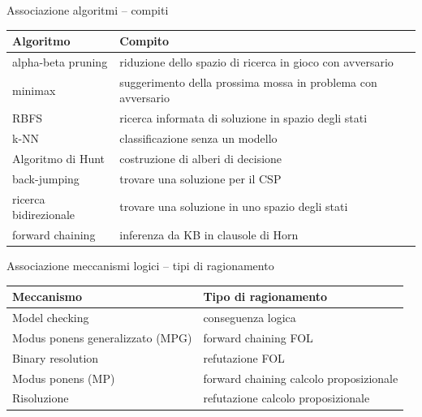 \documentclass[12pt,a4paper]{article}
\begin{document}
\begin{assocbox}{Associazione algoritmi -- compiti}
\begin{tabular}{ll}
\toprule
\textbf{Algoritmo} & \textbf{Compito} \\
\midrule
alpha-beta pruning & riduzione dello spazio di ricerca in gioco con avversario \\
minimax & suggerimento della prossima mossa in problema con avversario \\
RBFS & ricerca informata di soluzione in spazio degli stati \\
k-NN & classificazione senza un modello \\
Algoritmo di Hunt & costruzione di alberi di decisione \\
back-jumping & trovare una soluzione per il CSP \\
ricerca bidirezionale & trovare una soluzione in uno spazio degli stati \\
forward chaining & inferenza da KB in clausole di Horn \\
\bottomrule
\end{tabular}
\end{assocbox}

\bigskip
\begin{assocbox}{Associazione meccanismi logici -- tipi di ragionamento}
\begin{tabular}{ll}
\toprule
\textbf{Meccanismo} & \textbf{Tipo di ragionamento} \\
\midrule
Model checking & conseguenza logica \\
Modus ponens generalizzato (MPG) & forward chaining FOL \\
Binary resolution & refutazione FOL \\
Modus ponens (MP) & forward chaining calcolo proposizionale \\
Risoluzione & refutazione calcolo proposizionale \\
\bottomrule
\end{tabular}
\end{assocbox}
\end{document}
